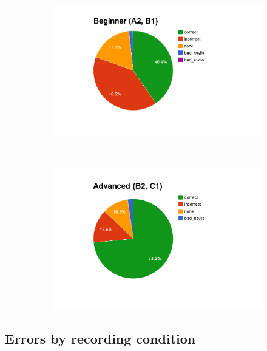 			
			\begin{figure}[htb]
				\centering
				\begin{subfigure}[t]{0.5\textwidth}
					\includegraphics[width=\textwidth]{img/annotation/beginnerPie}
					\caption{}
					\label{fig:levelgroupspies:beg}
				\end{subfigure}%
				~
				\begin{subfigure}[t]{0.5\textwidth}
					\includegraphics[width=\textwidth]{img/annotation/advancedPie}
					\caption{}
					\label{fig:levelgroupspies:adv}
				\end{subfigure}%
				\caption{}
				\label{fig:levelgroupspies}
			\end{figure}	
			
			
			
		
		\subsection{Errors by recording condition}
		\label{sec:results:condition}
			\TODO{}
		
